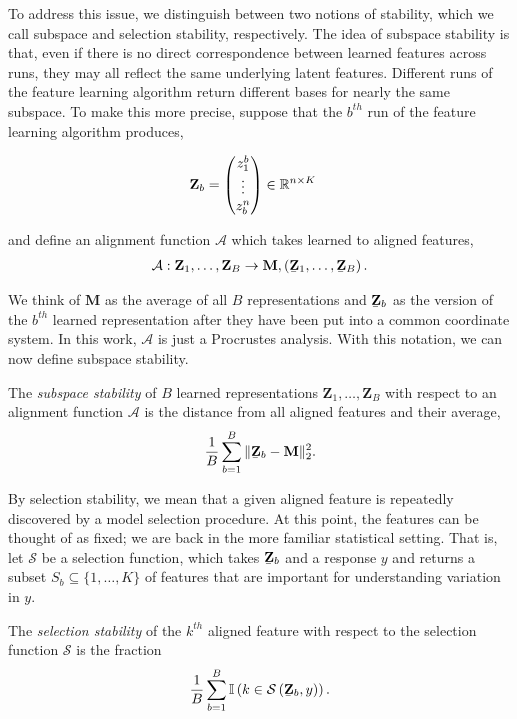 To address this issue, we distinguish between two notions of stability, which we
call subspace and selection stability, respectively. The idea of subspace
stability is that, even if there is no direct correspondence between learned
features across runs, they may all reflect the same underlying latent features.
Different runs of the feature learning algorithm return different bases for
nearly the same subspace. To make this more precise, suppose that the $b^{th}$
run of the feature learning algorithm produces,

\begin{align}
\mathbf{Z}_{b} &= \begin{pmatrix}
z^{b}_{1} \\
\vdots \\
z_{b}^{n}
\end{pmatrix} \in \mathbb{R}^{n \times K}
\end{align}

and define an alignment function $\mathcal{A}$ which takes learned to aligned
features,
\begin{align*}
\mathcal{A}: \mathbf{Z}_{1}, \dots, \mathbf{Z}_{B} \to \mathbf{M}, \left(\underaccent{\bar}{\mathbf{Z}}_{1}, \dots, \underaccent{\bar}{\mathbf{Z}}_{B}\right).
\end{align*}

We think of $\mathbf{M}$ as the average of all $B$ representations and
$\underaccent{\bar}{\mathbf{Z}}_{b}$ as the version of the $b^{th}$ learned
representation after they have been put into a common coordinate system. In this
work, $\mathcal{A}$ is just a Procrustes analysis. With this notation, we can
now define subspace stability.
\begin{definition}
The \textit{subspace stability} of $B$ learned representations $\mathbf{Z}_{1},
\dots, \mathbf{Z}_{B}$ with respect to an alignment function $\mathcal{A}$ is
the distance from all aligned features and their average,
\begin{align*}
\frac{1}{B} \sum_{b = 1}^{B} \|\underaccent{\bar}{\mathbf{Z}}_{b} - \mathbf{M}\|^{2}_{2}.
\end{align*}
\end{definition}

By selection stability, we mean that a given aligned feature is repeatedly
discovered by a model selection procedure. At this point, the features can be
thought of as fixed; we are back in the more familiar statistical setting. That
is, let $\mathcal{S}$ be a selection function, which takes
$\underaccent{\bar}{\mathbf{Z}}_{b}$ and a response $y$ and returns a subset
$S_{b} \subseteq \{1, \dots, K\}$ of features that are important for
understanding variation in $y$.

\begin{definition}
The \textit{selection stability} of the $k^{th}$ aligned feature with respect to the selection function $\mathcal{S}$ is the fraction
\begin{align*}
\frac{1}{B}\sum_{b = 1}^{B} \indic{k \in \mathcal{S}\left(\underaccent{\bar}{\mathbf{Z}}_{b}, y\right)}.
\end{align*}
\end{definition}
